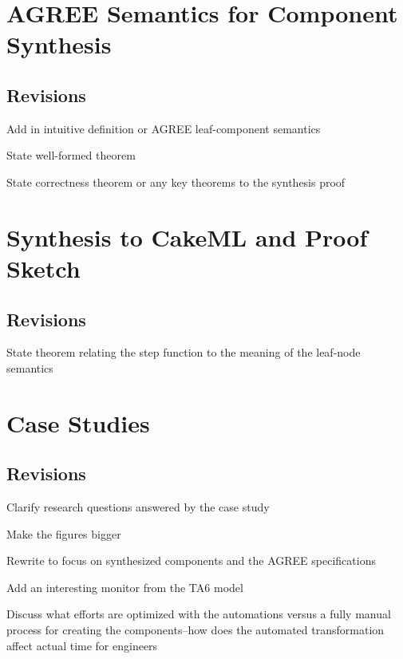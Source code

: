 \documentclass[global,twocolumn]{svjour}
\begin{document}
\section{AGREE Semantics for Component Synthesis}
\label{sec:semantics}


\subsection{Revisions}
\begin{compactitem}
  \item Add in intuitive definition or AGREE leaf-component semantics
  \item State well-formed theorem
  \item State correctness theorem or any key theorems to the synthesis proof
\end{compactitem}


\section{Synthesis to CakeML and Proof Sketch}
\label{sec:synthesis}


\subsection{Revisions}
\begin{compactitem}
  \item State theorem relating the step function to the meaning of the leaf-node semantics
\end{compactitem}

\section{Case Studies}
\label{sec:case-study}


\subsection{Revisions}
\begin{compactitem}
  \item Clarify research questions answered by the case study
  \item Make the figures bigger 
  \item Rewrite to focus on synthesized components and the AGREE specifications
  \item Add an interesting monitor from the TA6 model
  \item Discuss what efforts are optimized with the automations versus a fully manual process for creating the components--how does the automated transformation affect actual time for engineers
\end{compactitem}
\end{document}
